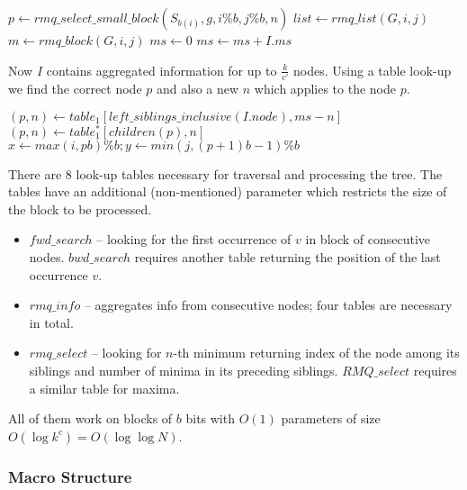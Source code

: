 \begin{algorithmic}
 
		\State $p \gets rmq\_select\_small\_block(S_{b(i)}, g, i \% b, j \% b, n)$
		\State {}
	\Else
		\State $list \gets rmq\_list(G, i, j)$
		\State $m \gets rmq\_block(G, i, j)$
		\State $ms \gets 0$
				\State $ms \gets ms + I.ms$
					\State \Break
				\EndIf
			\EndIf
		\EndFor
{}
\end{algorithmic}

Now $I$ contains aggregated information for up to $\frac{k}{c'}$ nodes.
Using a table look-up we find the correct node $p$ and also a new $n$ which applies to the node $p$.

\begin{algorithmic}
		\State $(p, n) \gets table_1[left\_siblings\_inclusive(I.node), ms - n]$
			\State $(p, n) \gets table_1^*[children(p), n]$
		\EndWhile
		\State $x \gets max(i, p b) \% b; y \gets min(j, (p+1) b -1) \% b$
		\State {}
	\EndIf
\EndFunction
\end{algorithmic}

There are 8 look-up tables necessary for traversal and processing the tree.
The tables have an additional (non-mentioned) parameter which restricts the size of the block to be processed.
\begin{itemize}
	\item $fwd\_search$ -- looking for the first occurrence of $v$ in block of consecutive nodes.
	$bwd\_search$ requires another table returning the position of the last occurrence $v$.
	\item $rmq\_info$ -- aggregates info from consecutive nodes; four tables are necessary in total.
	\item $rmq\_select$ -- looking for $n$-th minimum returning index of the node among its siblings and number of minima in its preceding siblings.
	$RMQ\_select$ requires a similar table for maxima.
\end{itemize}
All of them work on blocks of $b$ bits with $O(1)$ parameters of size $O(\log k^c) = O(\log \log N)$.

\subsubsection{Macro Structure}


